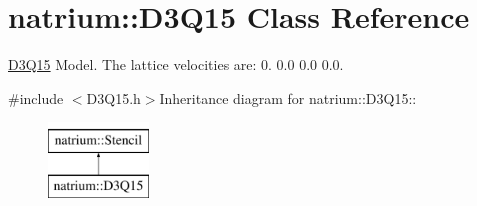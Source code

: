 \hypertarget{classnatrium_1_1D3Q15}{
\section{natrium::D3Q15 Class Reference}
\label{classnatrium_1_1D3Q15}
}


\hyperlink{classnatrium_1_1D3Q15}{D3Q15} Model. The lattice velocities are: 0. 0.0 0.0 0.0.  


{\ttfamily \#include $<$D3Q15.h$>$}Inheritance diagram for natrium::D3Q15::\begin{figure}[H]
\begin{center}
\leavevmode
\includegraphics[height=2cm]{classnatrium_1_1D3Q15}
\end{center}
\end{figure}

